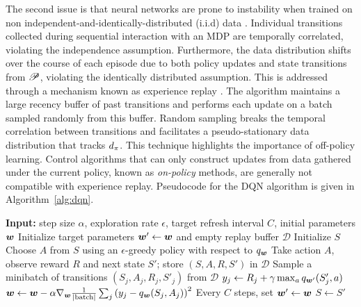   The second issue is that neural networks are prone to instability when trained on non independent-and-identically-distributed (i.i.d) data . Individual transitions collected during sequential interaction with an MDP are temporally correlated, violating the independence assumption. Furthermore, the data distribution shifts over the course of each episode due to both policy updates and state transitions from $\mathscr{P}$, violating the identically distributed assumption. This is addressed through a mechanism known as experience replay . The algorithm maintains a large recency buffer of past transitions and performs each update on a batch sampled randomly from this buffer. Random sampling breaks the temporal correlation between transitions and facilitates a pseudo-stationary data distribution that tracks $d_{\pi}$. This technique highlights the importance of off-policy learning. Control algorithms that can only construct updates from data gathered under the current policy, known as \textit{on-policy} methods, are generally not compatible with experience replay. Pseudocode for the DQN algorithm is given in Algorithm~\ref{alg:dqn}.
  
  \begin{algorithm}[t]
  \caption{Deep Q-Learning (DQN)}
  \label{alg:dqn}
  \begin{algorithmic}[1]
  \State \textbf{Input:} step size $\alpha$, exploration rate $\epsilon$, target refresh interval $C$, initial parameters ${\bm w}$
  \State Initialize target parameters ${\bm w}' \gets {\bm w}$ and empty replay buffer $\mathcal{D}$
      \State Initialize $S$
          \State Choose $A$ from $S$ using an $\epsilon$-greedy policy with respect to $q_{\bm w}$
          \State Take action $A$, observe reward $R$ and next state $S'$; store $(S, A, R, S')$ in $\mathcal{D}$
          \State Sample a minibatch of transitions $(S_j, A_j, R_j, S'_j)$ from $\mathcal{D}$
          \State $y_j \gets R_j + \gamma \max_{a} q_{{\bm w}'}(S'_j, a)$ 
          \State ${\bm w} \gets {\bm w} - \alpha \nabla_{{\bm w}} \frac{1}{|\text{batch}|}\sum_j \left( y_j - q_{\bm w}(S_j, A_j) \right)^2$
          \State Every $C$ steps, set ${\bm w}' \gets {\bm w}$ %
          \State $S \gets S'$
      \EndWhile
  \EndFor
  \end{algorithmic}
  \end{algorithm}
  
